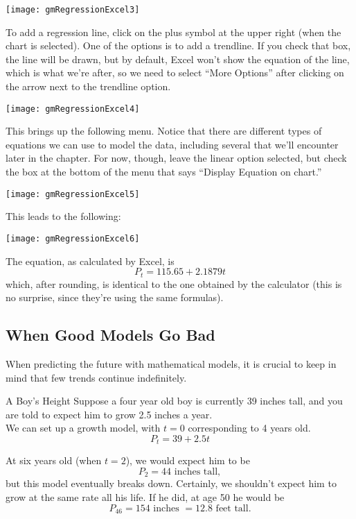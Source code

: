 \begin{center}
\texttt{[image: gmRegressionExcel3]}
\end{center}

To add a regression line, click on the plus symbol at the upper right (when the chart is selected).  One of the options is to add a trendline.  If you check that box, the line will be drawn, but by default, Excel won't show the equation of the line, which is what we're after, so we need to select ``More Options'' after clicking on the arrow next to the trendline option.

\begin{center}
\texttt{[image: gmRegressionExcel4]}
\end{center}

This brings up the following menu.  Notice that there are different types of equations we can use to model the data, including several that we'll encounter later in the chapter.  For now, though, leave the linear option selected, but check the box at the bottom of the menu that says ``Display Equation on chart.''

\begin{center}
\texttt{[image: gmRegressionExcel5]}
\end{center}

This leads to the following:

\begin{center}
\texttt{[image: gmRegressionExcel6]}
\end{center}

The equation, as calculated by Excel, is \[P_t = 115.65 + 2.1879t\] which, after rounding, is identical to the one obtained by the calculator (this is no surprise, since they're using the same formulas).

\subsection{When Good Models Go Bad}
When predicting the future with mathematical models, it is crucial to keep in mind that few trends continue indefinitely.

\begin{example}[https://www.youtube.com/watch?v=7_wAlvsCyDc]{A Boy's Height}
Suppose a four year old boy is currently 39 inches tall, and you are told to expect him to grow 2.5 inches a year.\\

We can set up a growth model, with $t=0$ corresponding to 4 years old.
\[P_t = 39 + 2.5t\]

At six years old (when $t=2$), we would expect him to be
\[P_2 = 44 \textrm{ inches tall},\]
but this model eventually breaks down.  Certainly, we shouldn't expect him to grow at the same rate all his life.  If he did, at age 50 he would be
\[P_{46} = 154 \textrm{ inches } = 12.8 \textrm{ feet tall}.\]
\end{example}

